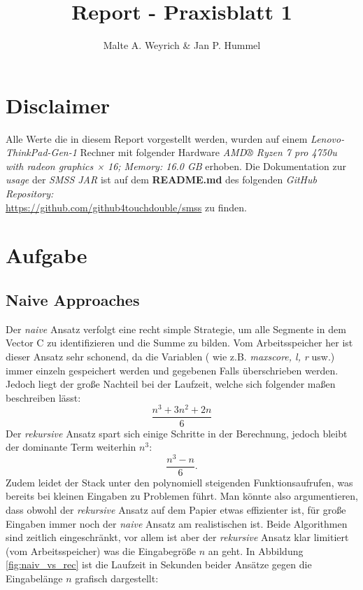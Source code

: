 \documentclass[10pt]{article}
\title{Report - Praxisblatt 1}
\author{Malte A. Weyrich \& Jan P. Hummel}
\begin{document}
\maketitle
\section*{Disclaimer}
    Alle Werte die in diesem Report vorgestellt werden, wurden auf einem \textit{Lenovo-ThinkPad-Gen-1} Rechner mit
    folgender Hardware \textit{AMD® Ryzen 7 pro 4750u with radeon graphics × 16; Memory: 16.0 GB} erhoben. 
    Die Dokumentation zur \textit{usage} der \textit{SMSS JAR} ist auf dem \textbf{README.md} des folgenden
    \textit{GitHub Repository:}\\
    \url{https://github.com/github4touchdouble/smss} zu finden.


\section{Aufgabe}
    \subsection{Naive Approaches}
    Der \textit{naive} Ansatz verfolgt eine recht simple Strategie, um alle Segmente in dem
    Vector C zu identifizieren und die Summe zu bilden. Vom Arbeitsspeicher her ist dieser Ansatz
    sehr schonend, da die Variablen ( wie z.B. \textit{maxscore, l, r} usw.) immer einzeln gespeichert werden
    und gegebenen Falls überschrieben werden. Jedoch liegt der gro\ss e Nachteil bei der Laufzeit, welche sich
    folgender ma\ss en beschreiben lässt:
    \[
        \frac{n^{3}+3n^{2}+2n}{6} 
    \]
    Der \textit{rekursive} Ansatz spart sich einige Schritte in der Berechnung, jedoch bleibt der dominante Term weiterhin
    $n^{3}$:
    \[
       \frac{n^{3}-n}{6}  
    .\]
    Zudem leidet der Stack unter den polynomiell steigenden Funktionsaufrufen, was bereits bei 
    kleinen Eingaben zu Problemen führt. Man könnte also argumentieren, dass obwohl der \textit{rekursive}
    Ansatz auf dem Papier etwas effizienter ist, für gro\ss e Eingaben immer noch der \textit{naive} Ansatz
    am realistischen ist. Beide Algorithmen sind zeitlich eingeschränkt, vor allem ist aber der 
    \textit{rekursive} Ansatz klar limitiert (vom Arbeitsspeicher) was die Eingabegrö\ss e $n$ an geht.
    In Abbildung \ref{fig:naiv_vs_rec} ist die Laufzeit in Sekunden beider Ansätze gegen die Eingabelänge $n$ grafisch dargestellt:
\end{document}
